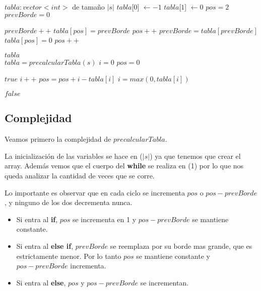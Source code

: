 \begin{algorithmic}

    \State $tabla : vector<int>$ de tamaño $|s|$
    \State $tabla$[$0$] $\gets -1$
    \State $tabla$[$1$] $\gets 0$
    \State $pos = 2$
    \State $prevBorde = 0$

            \State $prevBorde++$
            \State $tabla[pos] = prevBorde$
            \State $pos++$
            \State $prevBorde = tabla[prevBorde]$
        \Else
            \State $tabla[pos] = 0$
            \State $pos++$
        \EndIf
    \EndWhile

    \State \Return $tabla$
\EndFunction
\\

    \State $tabla = precalcularTabla(s)$
    \State $i = 0$
    \State $pos = 0$

                \State \Return $true$
            \EndIf
            \State $i++$
        \Else
            \State $pos = pos + i - tabla[i]$
            \State $i = max(0, tabla[i])$
        \EndIf
    \EndWhile

    \State \Return $false$
\EndFunction

\subsection{Complejidad}

Veamos primero la complejidad de $precalcularTabla$.

La inicialización de las variables se hace en \bigo($|s|$) ya que tenemos que crear el array.
Además vemos que el cuerpo del \textbf{while} se realiza en \bigo(1) por lo que nos queda analizar la cantidad de veces que se corre.

Lo importante es observar que en cada ciclo se incrementa $pos$ o $pos - prevBorde$, y ninguno de los dos decrementa nunca.

\begin{itemize}
    \item Si entra al \textbf{if}, $pos$ se incrementa en 1 y $pos - prevBorde$ se mantiene constante.
    \item Si entra al \textbf{else if}, $prevBorde$ se reemplaza por su borde mas grande, que es estrictamente menor. Por lo tanto $pos$ se mantiene constante y $pos - prevBorde$ incrementa.
    \item Si entra al \textbf{else}, $pos$ y $pos - prevBorde$ se incrementan.
\end{itemize}


\end{algorithmic}
